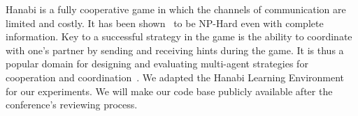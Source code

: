 \documentclass[letterpaper]{article} %
\begin{document}
Hanabi is a fully cooperative game in which the channels of communication are limited and costly. It has been  shown~\cite{baffier2016hanabi} to be NP-Hard even with complete information.
Key to a successful strategy in the game is the ability to coordinate with one's partner by sending and receiving hints during the game.   It is thus  a popular domain for designing and
evaluating multi-agent strategies for cooperation and coordination~\cite{bard2020hanabi}.
We adapted the Hanabi Learning Environment for our experiments. We will make our code base publicly available after the conference's reviewing process.




\end{document}
